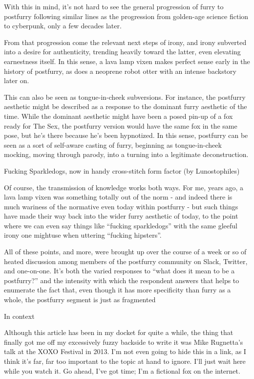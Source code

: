 With this in mind, it's not hard to see the general progression of furry to postfurry following similar lines as the progression from golden-age science fiction to cyberpunk, only a few decades later.

From that progression come the relevant next steps of irony, and irony subverted into a desire for authenticity, trending heavily toward the latter, even elevating earnestness itself.{ }In this sense, a lava lamp vixen makes perfect sense early in the history of postfurry, as does a neoprene robot otter with an intense backstory later on.

This can also be seen as tongue-in-cheek subversions.{ }For instance, the postfurry aesthetic might be described as a response to the dominant furry aesthetic of the time.{ }While the dominant aesthetic might have been a posed pin-up of a fox ready for The Sex, the postfurry version would have the same fox in the same pose, but he's there because he's been hypnotized.{ }In this sense, postfurry can be seen as a sort of self-aware casting of furry, beginning as tongue-in-cheek mocking, moving through parody, into a turning into a legitimate deconstruction.

Fucking Sparkledogs, now in handy cross-stitch form factor (by Lunostophiles)

Of course, the transmission of knowledge works both ways.{ }For me, years ago, a lava lamp vixen was something totally out of the norm - and indeed there is much wariness of the normative even today within postfurry - but such things have made their way back into the wider furry aesthetic of today, to the point where we can even say things like ``fucking sparkledogs'' with the same gleeful irony one mightuse when uttering ``fucking hipsters''.

All of these points, and more, were brought up over the course of a week or so of heated discussion among members of the postfurry community on Slack, Twitter, and one-on-one.{ }It's both the varied responses to ``what does it mean to be a postfurry?'' and the intensity with which the respondent answers that helps to enumerate the fact that, even though it has more specificity than furry as a whole, the postfurry segment is just as fragmented

In context

Although this article has been in my docket for quite a while, the thing that finally got me off my excessively fuzzy backside to write it was Mike Rugnetta's talk at the XOXO Festival in 2013.{ }I'm not even going to hide this in a link, as I think it's far, far too important to the topic at hand to ignore.{ }I'll just wait here while you watch it.{ }Go ahead, I've got time; I'm a fictional fox on the internet.

